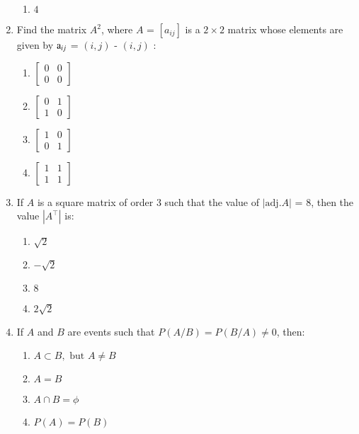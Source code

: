 \documentclass[12pt,-letter paper]{article}
\providecommand{\sbrak}[1]{\ensuremath{{}\left[#1\right]}}
\providecommand{\myvec}[1]{\ensuremath{\begin{bmatrix}#1\end{bmatrix}}}
\providecommand{\brak}[1]{\ensuremath{\left(#1\right)}}
\begin{document}
\begin{enumerate}
\begin{enumerate}[label={$\brak{\Alph*}$}]
      \item $4$                                                              \end{enumerate}                                                   
	\item Find the matrix $A^2$, where $A$ = $\sbrak{a_{ij}}$ is a        $2 \times 2 $ matrix whose elements are given by $\text a_{ij}$ = $\brak{i, j}$ - $\brak{i, j}$ :                            \begin{enumerate}[label={$\brak{\Alph*}$}]
                \item $\myvec{0 & 0 \\ 0 & 0}$
                \item $\myvec{0 & 1 \\ 1 & 0}$
                \item $\myvec{1 & 0 \\ 0 & 1}$
                \item $\myvec{1 & 1 \\ 1 & 1}$
                \end{enumerate}

	\item If $A$ is a square matrix of order $3$ such that the value of $ |\text{adj}.A| $ = $ 8 $, then the value $|A^\top|$ is:
            \begin{enumerate}[label={$\brak{\Alph*}$}]
        \item $\sqrt{2}$
        \item $-\sqrt{2}$
        \item $8$
        \item $2\sqrt{2}$
    \end{enumerate}

    \item If $A$ and $B$ are events such that $P$\brak{A/B}$ = P$\brak{B/A}$ \neq 0$, then:
            \begin{enumerate}[label={$\brak{\Alph*}$}]
        \item $A \subset B, \text{ but } A \neq B$
        \item $A = B$
        \item $A \cap B = \phi$
        \item $P(A) = P(B)$
    \end{enumerate}
\end{enumerate}
\end{document}
